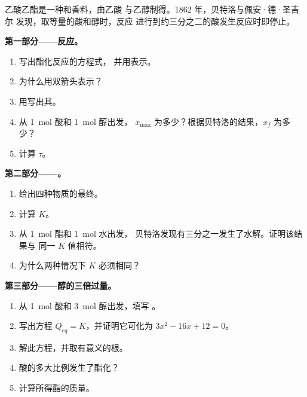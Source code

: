 \begin{problem}
\label{pb:g12:equilibrium:1}
乙酸乙酯是一种和香料，由乙酸
与乙醇制得。1862 年，贝特洛与佩安·德·圣吉尔
发现，取等量的酸和醇时，反应
进行到约三分之二的酸发生反应时即停止。

\medskip
\noindent\textbf{第一部分——反应。}
\begin{enumerate}
  \item 写出酯化反应的方程式，
        并用表示。
  \item 为什么用双箭头表示？
  \item 用写出其。
  \item 从 \qty{1}{mol} 酸和 \qty{1}{mol} 醇出发，
        $x_{\max}$ 为多少？根据贝特洛的结果，$x_f$ 为多少？
  \item 计算 $\tau$。
\end{enumerate}

\medskip
\noindent\textbf{第二部分——。}
\begin{enumerate}[resume]
  \item 给出四种物质的最终。
  \item 计算 $K$。
  \item 从 \qty{1}{mol} 酯和 \qty{1}{mol} 水出发，
        贝特洛发现有三分之一发生了水解。证明该结果与
        同一 $K$ 值相符。
  \item 为什么两种情况下 $K$ 必须相同？
\end{enumerate}

\medskip
\noindent\textbf{第三部分——醇的三倍过量。}
\begin{enumerate}[resume]
  \item 从 \qty{1}{mol} 酸和 \qty{3}{mol} 醇出发，填写
        。
  \item 写出方程 $Q_{eq} = K$，并证明它可化为
        $3x^2 - 16x + 12 = 0$。
  \item 解此方程，并取有意义的根。
  \item 酸的多大比例发生了酯化？
  \item 计算所得酯的质量。
\end{enumerate}


\end{problem}
